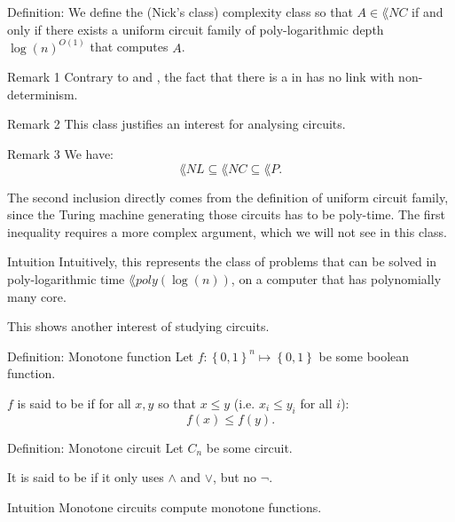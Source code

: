 \documentclass[a4paper]{article}
\begin{document}
\begin{parag}{Definition: }
    We define the  (Nick's class) complexity class so that $A \in \lang{NC}$ if and only if there exists a uniform circuit family of poly-logarithmic depth $\log\left(n\right)^{O\left(1\right)}$ that computes $A$.

    \begin{subparag}{Remark 1}
        Contrary to  and , the fact that there is a  in  has no link with non-determinism. 
    \end{subparag}

    \begin{subparag}{Remark 2}
        This class justifies an interest for analysing circuits.
    \end{subparag}

    \begin{subparag}{Remark 3}
        We have: 
        \[\lang{NL} \subseteq \lang{NC} \subseteq \lang{P}.\]
        
        The second inclusion directly comes from the definition of uniform circuit family, since the Turing machine generating those circuits has to be poly-time. The first inequality requires a more complex argument, which we will not see in this class.
    \end{subparag}

    \begin{subparag}{Intuition}
        Intuitively, this represents the class of problems that can be solved in poly-logarithmic time $\lang{poly}\left(\log\left(n\right)\right)$, on a computer that has polynomially many core.

        This shows another interest of studying circuits.
    \end{subparag}
\end{parag}

\begin{parag}{Definition: Monotone function}
    Let $f: \left\{0, 1\right\}^n \mapsto \left\{0, 1\right\}$ be some boolean function.

    $f$ is said to be  if for all $x, y$ so that $x \leq y$ (i.e. $x_i \leq y_i$ for all $i$): 
    \[f\left(x\right) \leq f\left(y\right).\]
\end{parag}

\begin{parag}{Definition: Monotone circuit}
    Let $C_n$ be some circuit.

    It is said to be  if it only uses $\land$ and $\lor$, but no $\lnot$.

    \begin{subparag}{Intuition}
        Monotone circuits compute monotone functions.
    \end{subparag}
\end{parag}
\end{document}
